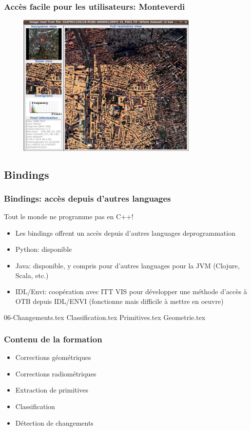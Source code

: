 \documentclass[compress]{beamer}
\begin{document}
\begin{frame}
\frametitle{Accès facile pour les utilisateurs: Monteverdi}
\begin{figure}[]
  \includegraphics[width=0.8\textwidth]{monteverdi2.jpg}
\end{figure}
\end{frame}

\subsection{Bindings}
\begin{frame}
\frametitle{Bindings: accès depuis d'autres languages}
\begin{block}{Tout le monde ne programme pas en C++!}
\scriptsize
\begin{itemize}
\item Les bindings offrent un accès depuis d'autres languages deprogrammation
\item \alert{Python}: disponible
\item \alert{Java}: disponible, y compris pour d'autres languages pour
  la JVM (Clojure, Scala, etc.)
\item \alert{IDL/Envi}: coopération avec ITT VIS pour développer une
  méthode d'accès à OTB depuis IDL/ENVI (fonctionne mais difficile à
  mettre en oeuvre)
\end{itemize}
\end{block}
\end{frame}

06-Changements.tex
Classification.tex
Primitives.tex
Geometrie.tex


\begin{frame}
  \frametitle{Contenu de la formation}
  \begin{itemize}
  \item Corrections géométriques
  \item Corrections radiométriques
  \item Extraction de primitives
  \item Classification
  \item Détection de changements
  \end{itemize}
\end{frame}
\end{document}
